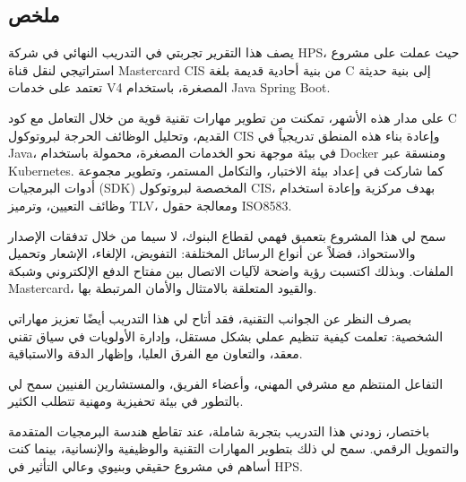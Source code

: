 \documentclass[12pt,a4paper]{report}
\begin{document}
\begin{RTL}
\section*{\textarabic{ملخص}}
{\arabicfont

يصف هذا التقرير تجربتي في التدريب النهائي في شركة HPS، حيث عملت على مشروع استراتيجي لنقل قناة Mastercard CIS من بنية أحادية قديمة بلغة C إلى بنية حديثة تعتمد على خدمات V4 المصغرة، باستخدام Java Spring Boot.

على مدار هذه الأشهر، تمكنت من تطوير مهارات تقنية قوية من خلال التعامل مع كود C القديم، وتحليل الوظائف الحرجة لبروتوكول CIS وإعادة بناء هذه المنطق تدريجياً في Java، في بيئة موجهة نحو الخدمات المصغرة، محمولة باستخدام Docker ومنسقة عبر Kubernetes. كما شاركت في إعداد بيئة الاختبار، والتكامل المستمر، وتطوير مجموعة أدوات البرمجيات (SDK) المخصصة لبروتوكول CIS، بهدف مركزية وإعادة استخدام وظائف التعيين، وترميز TLV، ومعالجة حقول ISO8583.

سمح لي هذا المشروع بتعميق فهمي لقطاع البنوك، لا سيما من خلال تدفقات الإصدار والاستحواذ، فضلاً عن أنواع الرسائل المختلفة: التفويض، الإلغاء، الإشعار وتحميل الملفات. وبذلك اكتسبت رؤية واضحة لآليات الاتصال بين مفتاح الدفع الإلكتروني وشبكة Mastercard، والقيود المتعلقة بالامتثال والأمان المرتبطة بها.

بصرف النظر عن الجوانب التقنية، فقد أتاح لي هذا التدريب أيضًا تعزيز مهاراتي الشخصية: تعلمت كيفية تنظيم عملي بشكل مستقل، وإدارة الأولويات في سياق تقني معقد، والتعاون مع الفرق العليا، وإظهار الدقة والاستباقية.

التفاعل المنتظم مع مشرفي المهني، وأعضاء الفريق، والمستشارين الفنيين سمح لي بالتطور في بيئة تحفيزية ومهنية تتطلب الكثير.

باختصار، زودني هذا التدريب بتجربة شاملة، عند تقاطع هندسة البرمجيات المتقدمة والتمويل الرقمي. سمح لي ذلك بتطوير المهارات التقنية والوظيفية والإنسانية، بينما كنت أساهم في مشروع حقيقي وبنيوي وعالي التأثير في HPS.

}
\end{RTL}

\clearpage
\end{document}
